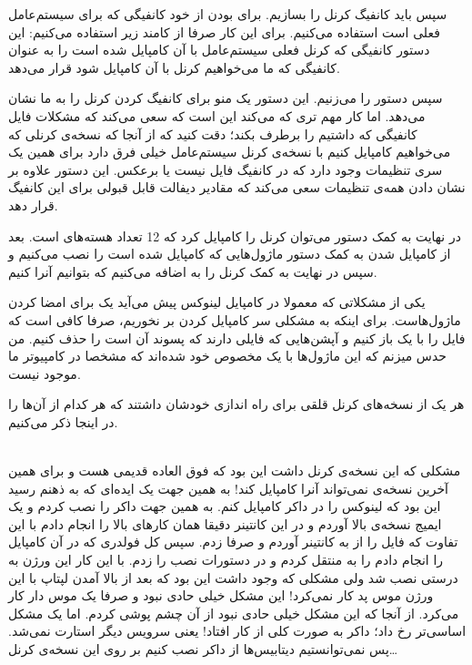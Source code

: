 سپس باید کانفیگ کرنل را بسازیم. برای
بودن از خود کانفیگی که برای سیستم‌عامل فعلی است استفاده می‌کنیم. برای این کار صرفا از کامند زیر
استفاده می‌کنیم:
این دستور کانفیگی که کرنل فعلی سیستم‌عامل با آن کامپایل شده است را به عنوان کانفیگی که ما می‌خواهیم
کرنل با آن کامپایل شود قرار می‌دهد.

سپس دستور
را می‌زنیم. این دستور یک منو برای کانفیگ کردن کرنل را به ما نشان می‌دهد. اما کار مهم تری که می‌کند این است که
سعی می‌کند که مشکلات فایل کانفیگی که داشتیم را برطرف بکند؛ دقت کنید که از آنجا که نسخه‌ی کرنلی که می‌خواهیم
کامپایل کنیم با نسخه‌ی کرنل سیستم‌عامل خیلی فرق دارد برای همین یک سری تنظیمات وجود دارد که در کانفیگ فایل نیست
یا برعکس. این دستور علاوه بر نشان دادن همه‌ی تنظیمات سعی می‌کند که مقادیر دیفالت قابل قبولی برای
این کانفیگ قرار دهد.

در نهایت به کمک دستور
می‌توان کرنل را کامپایل کرد که 12 تعداد هسته‌های
است. بعد از کامپایل شدن به کمک دستور
ماژول‌هایی که کامپایل شده است را نصب می‌کنیم و سپس در نهایت به کمک
کرنل را به
اضافه می‌کنیم که بتوانیم آنرا
کنیم.

یکی از مشکلاتی که معمولا در کامپایل لینوکس پیش می‌آید یک
برای امضا کردن ماژول‌هاست. برای اینکه به مشکلی سر کامپایل کردن بر نخوریم، صرفا کافی است که فایل
را با یک
باز کنیم و آپشن‌هایی که فایلی دارند که پسوند آن
است را حذف کنیم. من حدس میزنم که این ماژول‌ها با یک
مخصوص خود
شده‌اند که مشخصا در کامپیوتر ما موجود نیست.

هر یک از نسخه‌های کرنل قلقی برای راه اندازی خودشان داشتند که هر کدام از آن‌ها را در اینجا
ذکر می‌کنیم.

\\\noindent
مشکلی که این نسخه‌ی کرنل داشت این بود که فوق العاده قدیمی هست و برای همین آخرین نسخه‌ی
نمی‌تواند آنرا کامپایل کند! به همین جهت یک ایده‌ای که به ذهنم رسید این بود که لینوکس را در داکر
کامپایل کنم. به همین جهت داکر را نصب کردم و یک ایمیج نسخه‌ی
بالا آوردم و در این کانتینر دقیقا همان کار‌های بالا را انجام دادم با این تفاوت که فایل
را از
به کانتینر آوردم و صرفا
زدم. سپس کل فولدری که در آن کامپایل را انجام دادم را به
منتقل کردم و در
دستورات نصب را زدم. با این کار این ورژن به درستی نصب شد ولی مشکلی که وجود داشت این بود که
بعد از بالا آمدن لپتاپ با این ورژن موس پد کار نمی‌کرد! این مشکل خیلی حادی نبود و صرفا یک موس
دار کار می‌کرد. از آنجا که این مشکل خیلی حادی نبود از آن چشم پوشی کردم. اما یک مشکل اساسی‌تر رخ داد؛
داکر به صورت کلی از کار افتاد! یعنی سرویس
دیگر استارت نمی‌شد. پس نمی‌توانستیم دیتابیس‌ها از داکر نصب کنیم بر روی این نسخه‌ی کرنل\dots

